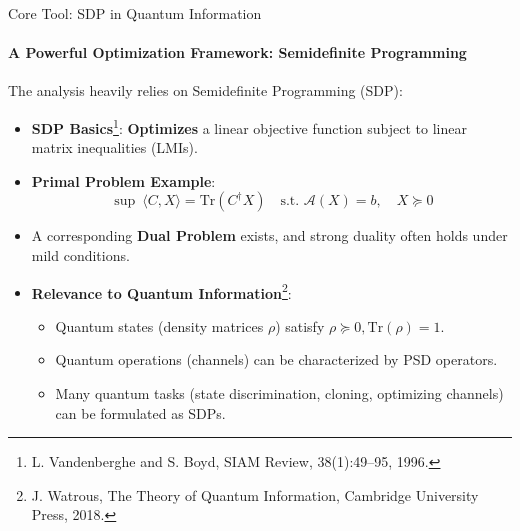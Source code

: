 \documentclass{beamer}
\begin{document}
\begin{frame}{Core Tool: SDP in Quantum Information}
    \framesubtitle{A Powerful Optimization Framework: Semidefinite Programming}
    The analysis heavily relies on Semidefinite Programming (SDP):
    \pause
    \begin{itemize}
        \item \textbf{SDP Basics}\footnote{L. Vandenberghe and S. Boyd, SIAM Review, 38(1):49–95, 1996.}: \textbf{Optimizes} a linear objective function subject to linear matrix inequalities (LMIs).
        \item \textbf{Primal Problem Example}:
        $$ \sup\ \langle C, X \rangle= \mathrm{Tr}(C^\dagger X) \quad \text{s.t. } \mathcal{A}(X) = b, \quad X \succeq 0 $$
        \item A corresponding \textbf{Dual Problem} exists, and strong duality often holds under mild conditions.
        \pause
        \item \textbf{Relevance to Quantum Information}\footnote{J. Watrous, The Theory of Quantum Information, Cambridge University Press, 2018.}:
            \begin{itemize}
                \item Quantum states (density matrices $\rho$) satisfy $\rho \succeq 0, \mathrm{Tr}(\rho)=1$.
                \item Quantum operations (channels) can be characterized by PSD operators.
                \item Many quantum tasks (state discrimination, cloning, optimizing channels) can be formulated as SDPs.
            \end{itemize}
    \end{itemize}
\end{frame}
\end{document}
